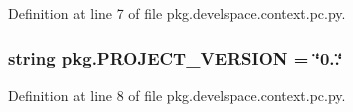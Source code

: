 Definition at line 7 of file pkg.\+develspace.\+context.\+pc.\+py.

\subsubsection[{\texorpdfstring{P\+R\+O\+J\+E\+C\+T\+\_\+\+V\+E\+R\+S\+I\+ON}{PROJECT_VERSION}}]{\setlength{\rightskip}{0pt plus 5cm}string pkg.\+P\+R\+O\+J\+E\+C\+T\+\_\+\+V\+E\+R\+S\+I\+ON = \char`\"{}0..\char`\"{}}\hypertarget{namespacepkg_ab1037914b9286bb61855131c06149648}{}\label{namespacepkg_ab1037914b9286bb61855131c06149648}


Definition at line 8 of file pkg.\+develspace.\+context.\+pc.\+py.

